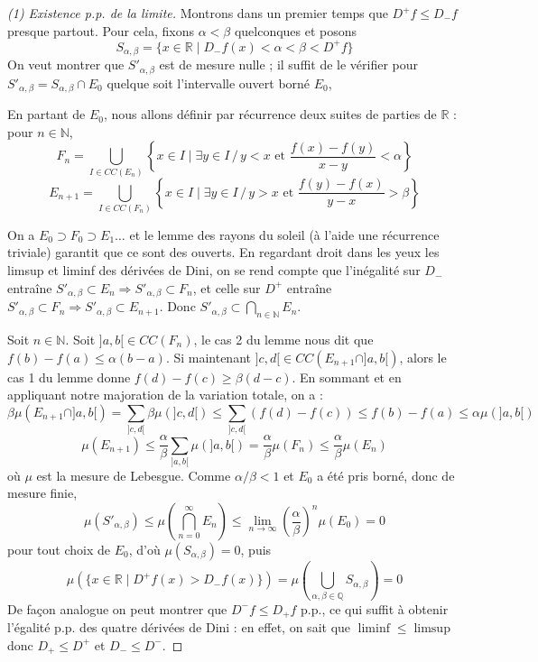 \documentclass[a4paper, 11pt]{article}
\def\N{\mathbb{N}}
\def\Q{\mathbb{Q}}
\def\R{\mathbb{R}}
\begin{document}
\begin{proof}[(1) Existence p.p. de la limite]
Montrons dans un premier temps que $D^+f \leq D_-f$ presque partout. Pour cela,
fixons $\alpha < \beta$ quelconques et posons
\[ S_{\alpha,\beta} = \{ x \in \R \mid D_-f(x) < \alpha < \beta < D^+f \} \]
On veut montrer que $S'_{\alpha,\beta}$ est de mesure nulle ; il suffit de le
vérifier pour $S'_{\alpha,\beta} = S_{\alpha,\beta} \cap E_0$ quelque soit
l'intervalle ouvert borné $E_0$,

En partant de $E_0$, nous allons définir par récurrence deux suites de parties
de $\R$ : pour $n \in \N$,
\[ F_n = \bigcup_{I \in CC(E_n)} \left\{ x \in I \mid \exists y \in I \,/\, y <
    x \text{ et } \frac{f(x) - f(y)}{x - y} < \alpha  \right\} \]
\[ E_{n+1} = \bigcup_{I \in CC(F_n)} \left\{ x \in I \mid \exists y \in I \,/\, y >
    x \text{ et } \frac{f(y) - f(x)}{y - x} > \beta  \right\} \]

On a $E_0 \supset F_0 \supset E_1 \ldots$ et le lemme des rayons du soleil (à
l'aide une récurrence triviale) garantit que ce sont des ouverts. En regardant
droit dans les yeux les limsup et liminf des dérivées de Dini, on se rend compte
que l'inégalité sur $D_-$ entraîne $S'_{\alpha,\beta} \subset E_n \Rightarrow
S'_{\alpha,\beta} \subset F_n$, et celle sur $D^+$ entraîne $S'_{\alpha,\beta}
\subset F_n \Rightarrow S'_{\alpha,\beta} \subset E_{n+1}$. Donc
$S'_{\alpha,\beta} \subset \bigcap_{n \in \N} E_n$.

Soit $n \in \N$. Soit $]a,b[ \in CC(F_n)$, le cas 2 du lemme nous dit que
$f(b) - f(a) \leq \alpha(b-a)$. Si maintenant $]c,d[ \in CC(E_{n+1} \cap
]a,b[)$, alors le cas 1 du lemme donne $f(d)-f(c) \geq \beta(d-c)$. En sommant
et en appliquant notre majoration de la variation totale, on a :
\[ \beta\mu(E_{n+1} \cap ]a,b[) = \sum_{]c,d[} \beta\mu(]c,d[) \leq \sum_{]c,d[}
  (f(d) - f(c)) \leq f(b) - f(a) \leq \alpha\mu(]a,b[) \]
\[ \mu(E_{n+1}) \leq \frac{\alpha}{\beta} \sum_{]a,b[} \mu(]a,b[) =
  \frac{\alpha}{\beta} \mu(F_n) \leq \frac{\alpha}{\beta} \mu(E_n) \] où $\mu$
est la mesure de Lebesgue. Comme $\alpha/\beta < 1$ et $E_0$ a été pris borné,
donc de mesure finie,
\[ \mu(S'_{\alpha,\beta}) \leq \mu \left( \bigcap_{n=0}^\infty E_n \right)
  \leq \lim_{n \to \infty} \left( \frac{\alpha}{\beta} \right)^n \mu(E_0) = 0 \]
pour tout choix de $E_0$, d'où $\mu(S_{\alpha,\beta}) = 0$, puis
\[ \mu\left( \{x \in \R \mid  D^+f(x) > D_-f(x) \} \right)
  = \mu\left( \bigcup_{\alpha, \beta \in \Q} S_{\alpha,\beta} \right)
  = 0 \]
De façon analogue on peut montrer que $D^-f \leq D_+f$ p.p., ce qui suffit à
obtenir l'égalité p.p. des quatre dérivées de Dini : en effet, on sait que
$\liminf \leq \limsup$ donc $D_+ \leq D^+$ et $D_- \leq D^-$.
\end{proof}
\end{document}
